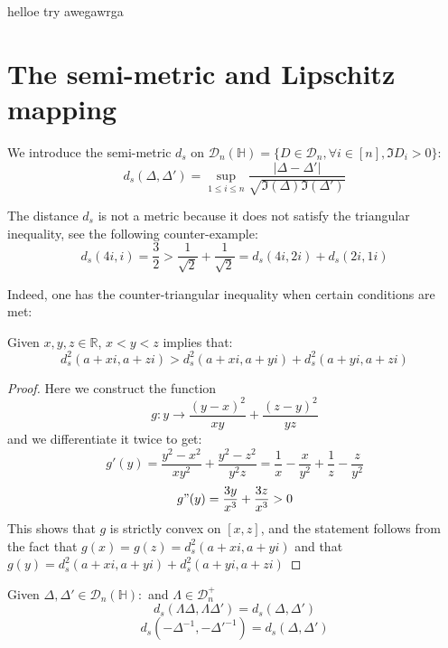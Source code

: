 \documentclass[ECP, preprint]{ejpecp} %
\begin{document}
helloe try awegawrga
\section{The semi-metric and Lipschitz mapping}
We introduce the semi-metric $d_s$ on $\mathcal{D}_n(\mathbb{H})=\{D\in \mathcal{D}_n,\forall i \in [n],\Im{D}_i>0\}$:
$$d_s(\Delta,\Delta')=\sup_{1\leq i\leq n}\frac{|\Delta-\Delta'|}{\sqrt{\Im(\Delta)\Im(\Delta')}}$$

The distance $d_s$ is not a metric because it does not satisfy the triangular inequality, see the following counter-example:
$$d_s(4i,i)=\frac{3}{2}>\frac{1}{\sqrt{2}}+\frac{1}{\sqrt{2}}=d_s(4i,2i)+d_s(2i,1i)$$

Indeed, one has the counter-triangular inequality when certain conditions are met:
\begin{lemma}
    Given $x,y,z\in \mathbb{R}$, $x<y<z$ implies that:
    $$d^2_s(a+xi,a+zi)>d^2_s(a+xi,a+yi)+d^2_s(a+yi,a+zi)$$
\end{lemma}
\begin{proof}
    Here we construct the function
    $$g:y\to \frac{(y-x)^2}{xy}+\frac{(z-y)^2}{yz}$$
and we differentiate it twice to get:
$$g'(y)=\frac{y^2-x^2}{xy^2}+\frac{y^2-z^2}{y^2z}=\frac{1}{x}-\frac{x}{y^2}+\frac{1}{z}-\frac{z}{y^2}$$
$$g"(y)=\frac{3y}{x^3}+\frac{3z}{x^3}>0$$
This shows that $g$ is strictly convex on $[x,z]$, and the statement follows from the fact that $g(x)=g(z)=d^2_s(a+xi,a+yi)$ and that $g(y)=d^2_s(a+xi,a+yi)+d^2_s(a+yi,a+zi)$
\end{proof}




\begin{lemma}
    Given $\Delta,\Delta'\in \mathcal{D}_n(\mathbb{H}):$ and $\Lambda\in \mathcal{D}^+_n$
    $$d_s(\Lambda\Delta,\Lambda\Delta')=d_s(\Delta,\Delta')$$ 
    $$d_s(-\Delta^{-1},-\Delta'^{-1})=d_s(\Delta,\Delta')$$
\end{lemma}
\end{document}
